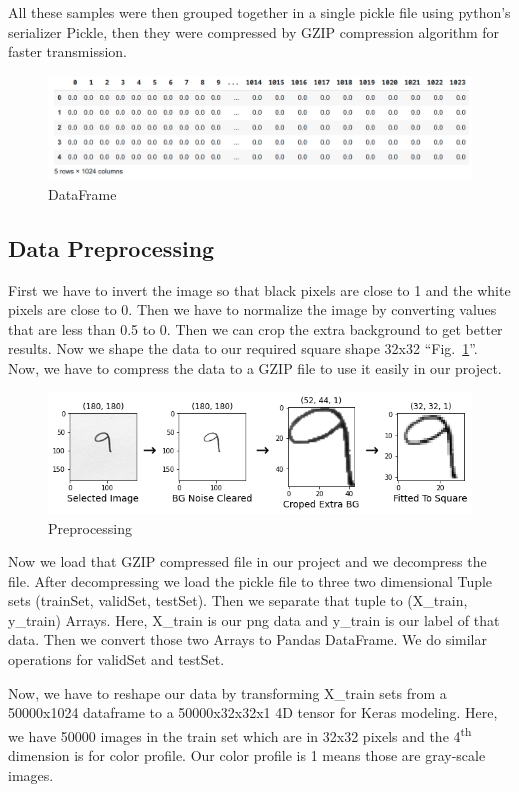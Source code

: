 \documentclass[conference]{IEEEtran}
\begin{document}
All these samples were then grouped together in a single pickle file using python's serializer Pickle, then they were compressed by GZIP compression algorithm for faster transmission.

\begin{figure}[htbp]
\centerline{\includegraphics[scale=.3]{fig2.png}}
\caption{DataFrame}
\label{fig2}
\end{figure}

\subsection{Data Preprocessing}
First we have to invert the image so that black pixels are close to 1 and the white pixels are close to 0.  Then we have to normalize the image by converting values that are less than 0.5 to 0. Then we can crop the extra background to get better results. Now we shape the data to our required square shape 32x32 ``Fig.~\ref{fig2}''. Now, we have to compress the data to a GZIP file to use it easily in our project.

\begin{figure}[htbp]
\centerline{\includegraphics[scale=.4]{fig3.png}}
\caption{Preprocessing}
\label{fig3}
\end{figure}

Now we load that GZIP compressed file in our project and we decompress the file. After decompressing we load the pickle file to three two dimensional Tuple sets (trainSet, validSet, testSet). Then we separate that tuple to (X\_train, y\_train) Arrays. Here, X\_train is our png data and y\_train is our label of that data. Then we convert those two Arrays to Pandas DataFrame. We do similar operations for validSet and testSet. 

Now, we have to reshape our data by transforming X\_train sets from a 50000x1024 dataframe to a 50000x32x32x1 4D tensor for Keras modeling. Here, we have 50000 images in the train set which are in 32x32 pixels and the 4\textsuperscript{th} dimension is for color profile. Our color profile is 1 means those are gray-scale images.\\ 
\end{document}
